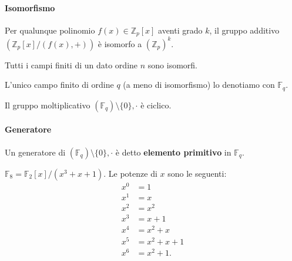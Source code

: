 \paragraph{Isomorfismo} Per qualunque polinomio $f(x) \in \mathbb{Z}_p[x]$ aventi grado $k$, il gruppo additivo $(\mathbb{Z}_p[x]/(f(x),+))$ è isomorfo a $(\mathbb{Z}_p)^k$. 

\begin{theorem}
    Tutti i campi finiti di un dato ordine $n$ sono isomorfi. 
\end{theorem}

\vspace{1em} \noindent L'unico campo finito di ordine $q$ (a meno di isomorfismo) lo denotiamo con $\mathbb{F}_q$. 

\begin{theorem}
    Il gruppo moltiplicativo $(\mathbb{F}_q)\setminus \{0\}, \cdot$ è ciclico. 
\end{theorem}

\paragraph{Generatore} Un generatore di $(\mathbb{F}_q)\setminus \{0\}, \cdot$ è detto \textbf{elemento primitivo} in $\mathbb{F}_q$. 

\begin{example}
    $\mathbb{F}_8=\mathbb{F}_2[x]/(x^3+x+1)$. Le potenze di $x$ sono le seguenti:
    \begin{align*}
        x^0&=1\\
        x^1&=x\\
        x^2&=x^2\\
        x^3&=x+1\\
        x^4&=x^2+x\\
        x^5&=x^2+x+1\\
        x^6&=x^2+1.
    \end{align*}
\end{example}